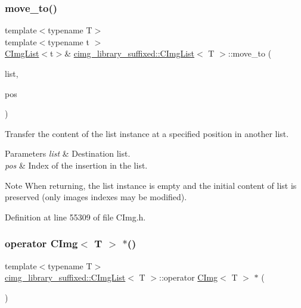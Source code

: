 \subsubsection{\texorpdfstring{move\+\_\+to()}{move\_to()}\hspace{0.1cm}{\footnotesize\ttfamily [2/2]}}
{\footnotesize\ttfamily template$<$typename T$>$ \\
template$<$typename t $>$ \\
\hyperlink{structcimg__library__suffixed_1_1CImgList}{C\+Img\+List}$<$t$>$\& \hyperlink{structcimg__library__suffixed_1_1CImgList}{cimg\+\_\+library\+\_\+suffixed\+::\+C\+Img\+List}$<$ T $>$\+::move\+\_\+to (\begin{DoxyParamCaption}\item[{\hyperlink{structcimg__library__suffixed_1_1CImgList}{C\+Img\+List}$<$ t $>$ \&}]{list,  }\item[{const unsigned int}]{pos }\end{DoxyParamCaption})\hspace{0.3cm}{\ttfamily [inline]}}



Transfer the content of the list instance at a specified position in another list. 


\begin{DoxyParams}{Parameters}
{\em list} & Destination list. \\
\hline
{\em pos} & Index of the insertion in the list. \\
\hline
\end{DoxyParams}
\begin{DoxyNote}{Note}
When returning, the list instance is empty and the initial content of {\ttfamily list} is preserved (only images indexes may be modified). 
\end{DoxyNote}


Definition at line 55309 of file C\+Img.\+h.

\mbox{\label{structcimg__library__suffixed_1_1CImgList_a9307777e475ee49b57aabbdbf2a24691}} 
\subsubsection{\texorpdfstring{operator C\+Img$<$ T $>$ $\ast$()}{operator CImg< T > *()}}
{\footnotesize\ttfamily template$<$typename T$>$ \\
\hyperlink{structcimg__library__suffixed_1_1CImgList}{cimg\+\_\+library\+\_\+suffixed\+::\+C\+Img\+List}$<$ T $>$\+::operator \hyperlink{structcimg__library__suffixed_1_1CImg}{C\+Img}$<$ T $>$ $\ast$ (\begin{DoxyParamCaption}{ }\end{DoxyParamCaption})\hspace{0.3cm}{\ttfamily [inline]}}



